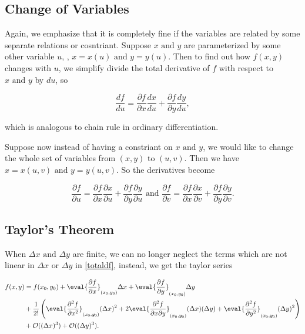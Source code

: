 \documentclass[english,a4paper,12pt]{report}
\begin{document}
\subsection{Change of Variables}

Again, we emphasize that it is completely fine if the variables are related by some separate relations or cosntriant. Suppose \(x \text { and } y\) are parameterized by some other variable \(u\), \ie, \(x = x(u) \text { and } y = y(u)\). Then to find out how \(f(x,y)\) changes with \(u\), we simplify divide the total derivative of \(f\) with respect to \(x \text { and } y\) by \(du\), so

\begin{equation}
    \frac{df}{du} = \frac{\partial f}{\partial x} \frac{dx}{du} + \frac{\partial f}{\partial y} \frac{dy}{du},
\end{equation}

which is analogous to chain rule in ordinary differentiation.

Suppose now instead of having a constriant on \(x\text { and } y\), we would like to change the whole set of variables from \((x,y)\) to \((u,v)\). Then we have \(x = x(u,v) \text { and } y = y(u,v)\). So the derivatives become

\begin{equation} \label{changeofvar} 
    \frac{\partial f}{\partial u} = \frac{\partial f}{\partial x} \frac{\partial x}{\partial u} + \frac{\partial f}{\partial y} \frac{\partial y}{\partial u} \text { and } \frac{\partial f}{\partial v} = \frac{\partial f}{\partial x} \frac{\partial x}{\partial v} + \frac{\partial f}{\partial y} \frac{\partial y}{\partial v}.  
\end{equation}



\subsection{Taylor's Theorem}
When \(\Delta x \text { and }  \Delta y\) are finite, we can no longer neglect the terms which are not linear in \(\Delta x \text { or } \Delta y\) in \cref{totaldf}, instead, we get the taylor series 

\begin{equation}
    \begin{aligned}
    f(x,y) &= f(x_0 ,y_0 ) + \eval{\frac{\partial f}{\partial x}}_{(x_0 ,y_0 )}  \Delta x + \eval{\frac{\partial f}{\partial y}}_{(x_0 ,y_0 )} \Delta y \\ &+ \frac{1}{2!} \left( \eval{\frac{\partial^2 f}{\partial x^2}}_{(x_0 ,y_0 )}  (\Delta x)^2 + 2\eval{\frac{\partial^2 f}{\partial x \partial y}}_{(x_0 ,y_0 )}(\Delta x)(\Delta y) + \eval{\frac{\partial^2 f}{\partial y^2}}_{(x_0 ,y_0 )} (\Delta y)^2 \right) \\ &+ \mathcal{O}((\Delta x)^3 ) + \mathcal{O}((\Delta y)^3 ).        
    \end{aligned}
\end{equation}
\end{document}
